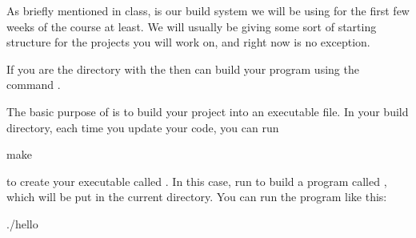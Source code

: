 \documentclass{tufte-handout}
\begin{document}
As briefly mentioned in class,  is our build system we
will be using for the first few weeks of the course at least.  We will
usually be giving some sort of starting structure for the projects you
will work on, and right now is no exception.

If you are the directory with the 
then can build your program using the command .





The basic purpose of  is to build your project into an
executable file. In your build directory, each time you update your
code, you can run

\begin{CmdLine*}
  \C make \\
\end{CmdLine*}

\noindent to create your executable called .  In
this case, run  to build a program called
, which will be put in the current directory. You can
run the program like this:

\begin{CmdLine*}
  \C ./hello\\
\end{CmdLine*}
\end{document}
